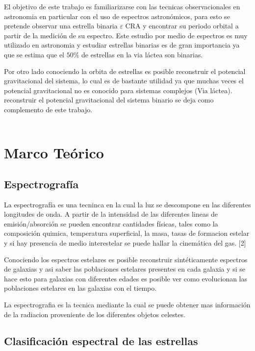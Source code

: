 \documentclass[Proceedings]{ascelike}
\begin{document}
El objetivo de este trabajo es familiarizarse con las tecnicas observacionales en astronomia en particular
con el uso de espectros astron\'omicos, para esto se pretende observar una estrella binaria $\varepsilon$ CRA 
y encontrar su periodo orbital a partir de la medici\'on de su espectro. Este estudio por medio de espectros es muy utilizado en astronomia y estudiar estrellas binarias es de gran importancia ya que se estima que el $50\%$ de estrellas en la via l\'actea son binarias.  

Por otro lado conociendo la orbita de estrellas es posible reconstruir el potencial gravitacional 
del sistema, lo cual es de bastante utilidad ya que muchas veces el potencial gravitacional no es conocido para sistemas complejos (Via l\'actea). reconstruir el potencial gravitacional del sistema binario se deja como 
complemento de este trabajo.\\
\\

\section{Marco Te\'orico}

\subsection{Espectrograf\'ia}

La espectrograf\'ia es una tecninca en la cual la luz se descompone en las diferentes
longitudes de onda. A partir de la intensidad de las diferentes lineas de emisi\'on/absorci\'on
se pueden encontrar cantidades f\'isicas, tales 
como la composici\'on quimica, temperatura superficial, la masa, tasas de formacion estelar
 y si hay presencia de medio interestelar se puede hallar la cinem\'atica del gas. [2]
 
Conociendo los espectros estelares es posible reconstruir sint\'eticamente espectros de galaxias
y asi saber las poblaciones estelares presentes en cada galaxia y si se hace esto para galaxias
con diferentes edades es posible ver como evolucionan las poblaciones estelares en las galaxias 
con el tiempo.

La espectrografia es la tecnica mediante la cual se puede obtener mas informaci\'on de la radiacion 
proveniente de los diferentes objetos celestes.

\subsection{Clasificaci\'on espectral de las estrellas}
\end{document}
